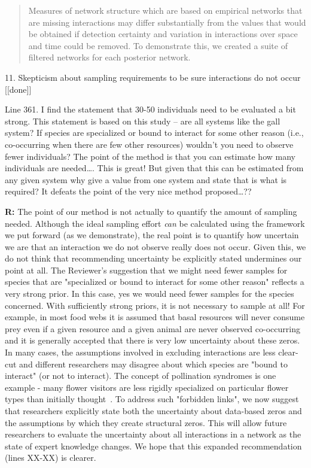 \documentclass[12pt]{letter}
\newenvironment{refquote}{\bigskip \begin{it}}{\end{it}\smallskip}
\begin{document}
\begin{itemize}
		\begin{quotation}
			Measures of network structure which are based on empirical networks that are missing interactions may differ substantially from the values that would be obtained if detection certainty and variation in interactions over space and time could be removed. To demonstrate this, we created a suite of filtered networks for each posterior network. 
		\end{quotation}


	11. Skepticism about sampling requirements to be sure interactions do not occur [[done]]

		\begin{refquote}
		Line 361.  I find the statement that 30-50 individuals need to be evaluated a bit strong.  This statement is based on this study – are all systems like the gall system?  If species are specialized or bound to interact for some other reason (i.e., co-occurring when there are few other resources) wouldn’t you need to observe fewer individuals?  The point of the method is that you can estimate how many individuals are needed…. This is great!  But given that this can be estimated from any given system why give a value from one system and state that is what is required?  It defeats the point of the very nice method proposed…??
		\end{refquote}

		\textbf{R:} The point of our method is not actually to quantify the amount of sampling needed. Although the ideal sampling effort \emph{can} be calculated using the framework we put forward (as we demonstrate), the real point is to quantify how uncertain we are that an interaction we do not observe really does not occur. Given this, we do not think that recommending uncertainty be explicitly stated undermines our point at all. 
		\smallskip
		The Reviewer's suggestion that we might need fewer samples for species that are "specialized or bound to interact for some other reason" reflects a very strong prior. In this case, yes we would need fewer samples for the species concerned. With sufficiently strong priors, it is not necessary to sample at all! For example, in most food webs it is assumed that basal resources will never consume prey even if a given resource and a given animal are never observed co-occurring and it is generally accepted that there is very low uncertainty about these zeros. In many cases, the assumptions involved in excluding interactions are less clear-cut and different researchers may disagree about which species are "bound to interact" (or not to interact). The concept of pollination syndromes is one example - many flower visitors are less rigidly specialized on particular flower types than initially thought~\citep{}. To address such "forbidden links", we now suggest that researchers explicitly state both the uncertainty about data-based zeros and the assumptions by which they create structural zeros. This will allow future researchers to evaluate the uncertainty about all interactions in a network as the state of expert knowledge changes. We hope that this expanded recommendation (lines XX-XX) is clearer.



\end{itemize}
\end{document}
